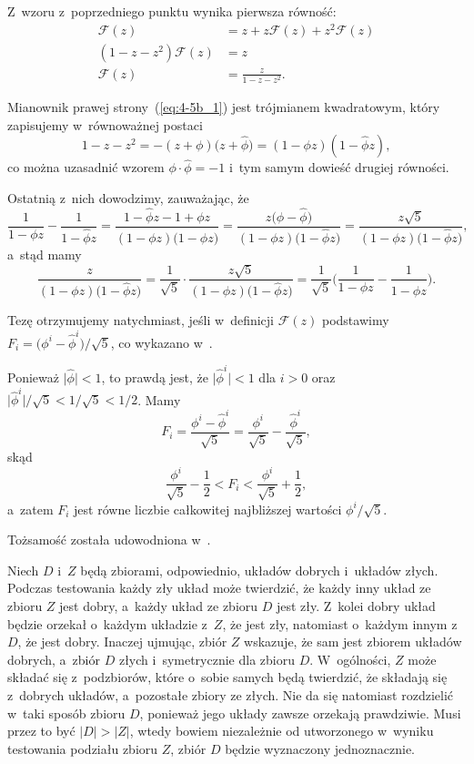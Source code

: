 \subproblem %
Z~wzoru z~poprzedniego punktu wynika pierwsza równość:
\begin{align*}
	\mathcal{F}(z) &= z+z\mathcal{F}(z)+z^2\mathcal{F}(z) \\
	(1-z-z^2)\mathcal{F}(z) &= z \\
	\mathcal{F}(z) &= \frac{z}{1-z-z^2}. \tag{$*$}\label{eq:4-5b_1}
\end{align*}

Mianownik prawej strony~(\ref{eq:4-5b_1}) jest trójmianem kwadratowym, który zapisujemy w~równoważnej postaci
\[
	1-z-z^2 = -(z+\phi)\bigl(z+\widehat\phi\bigr) = (1-\phi z)(1-\widehat\phi z), \label{eq:4-5b_2}
\]
co można uzasadnić wzorem $\phi\cdot\widehat\phi=-1$ i~tym samym dowieść drugiej równości.

Ostatnią z~nich dowodzimy, zauważając, że
\[
	\frac{1}{1-\phi z}-\frac{1}{1-\widehat\phi z} = \frac{1-\widehat\phi z-1+\phi z}{(1-\phi z)\bigl(1-\widehat\phi z\bigr)} = \frac{z\bigl(\phi-\widehat\phi\bigr)}{(1-\phi z)\bigl(1-\widehat\phi z\bigr)} = \frac{z\sqrt{5}}{(1-\phi z)\bigl(1-\widehat\phi z\bigr)},
\]
a~stąd mamy
\[
	\frac{z}{(1-\phi z)\bigl(1-\widehat\phi z\bigr)} = \frac{1}{\sqrt{5}}\cdot\frac{z\sqrt{5}}{(1-\phi z)\bigl(1-\widehat\phi z\bigr)} = \frac{1}{\sqrt{5}}\biggl(\frac{1}{1-\phi z}-\frac{1}{1-\widehat\phi z}\biggr).
\]

\subproblem %
Tezę otrzymujemy natychmiast, jeśli w~definicji $\mathcal{F}(z)$ podstawimy $F_i=\bigl(\phi^i-\widehat\phi^i\bigr)/\sqrt{5}$, co wykazano w~.

\subproblem %
Ponieważ $\bigl|\widehat\phi\bigr|<1$, to prawdą jest, że $\bigl|\widehat\phi^i\bigr|<1$ dla $i>0$ oraz $\bigl|\widehat\phi^i\bigr|/\sqrt{5}<1/\sqrt{5}<1/2$. Mamy
\[
	F_i = \frac{\phi^i-\widehat\phi^i}{\sqrt{5}} = \frac{\phi^i}{\sqrt{5}}-\frac{\widehat\phi^i}{\sqrt{5}},
\]
skąd
\[
	\frac{\phi^i}{\sqrt{5}}-\frac{1}{2} < F_i < \frac{\phi^i}{\sqrt{5}}+\frac{1}{2},
\]
a~zatem $F_i$ jest równe liczbie całkowitej najbliższej wartości $\phi^i/\sqrt{5}$.

\subproblem %
Tożsamość została udowodniona w~.


\subproblem %
Niech $D$ i~$Z$ będą zbiorami, odpowiednio, układów dobrych i~układów złych. Podczas testowania każdy zły układ może twierdzić, że każdy inny układ ze zbioru $Z$ jest dobry, a~każdy układ ze zbioru $D$ jest zły. Z~kolei dobry układ będzie orzekał o~każdym układzie z~$Z$, że jest zły, natomiast o~każdym innym z~$D$, że jest dobry. Inaczej ujmując, zbiór $Z$ wskazuje, że sam jest zbiorem układów dobrych, a~zbiór $D$ złych i~symetrycznie dla zbioru $D$. W~ogólności, $Z$ może składać się z~podzbiorów, które o~sobie samych będą twierdzić, że składają się z~dobrych układów, a~pozostałe zbiory ze złych. Nie da się natomiast rozdzielić w~taki sposób zbioru $D$, ponieważ jego układy zawsze orzekają prawdziwie. Musi przez to być $|D|>|Z|$, wtedy bowiem niezależnie od utworzonego w~wyniku testowania podziału zbioru $Z$, zbiór $D$ będzie wyznaczony jednoznacznie.


